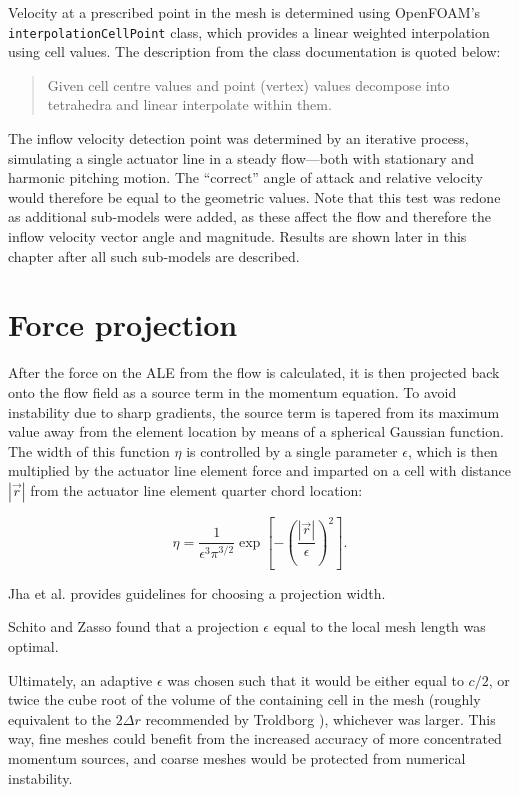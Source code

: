 Velocity at a prescribed point in the mesh is determined using OpenFOAM's
\texttt{interpolationCellPoint} class, which provides a linear weighted
interpolation using cell values. The description from the class documentation is
quoted below:

\begin{quote}
    Given cell centre values and point (vertex) values decompose into
    tetrahedra and linear interpolate within them.
\end{quote}

The inflow velocity detection point was determined by an iterative process,
simulating a single actuator line in a steady flow---both with stationary and
harmonic pitching motion. The ``correct'' angle of attack and relative velocity
would therefore be equal to the geometric values. Note that this test was redone
as additional sub-models were added, as these affect the flow and therefore the
inflow velocity vector angle and magnitude. Results are shown later in this
chapter after all such sub-models are described.


\section{Force projection}

After the force on the ALE from the flow is calculated, it is then projected
back onto the flow field as a source term in the momentum equation. To avoid
instability due to sharp gradients, the source term is tapered from its maximum
value away from the element location by means of a spherical Gaussian function.
The width of this function $\eta$ is controlled by a single parameter
$\epsilon$, which is then multiplied by the actuator line element force and
imparted on a cell with distance $| \vec{r} |$ from the actuator line element
quarter chord location:

\begin{equation}
    \eta = \frac{1}{\epsilon^3 \pi^{3/2}} \exp 
    \left[ - \left( \frac{| \vec{r} |}{\epsilon} \right)^2 \right].
    \label{eq:projection}
\end{equation}

Jha et al. \cite{Jha2014} provides guidelines for choosing a projection width.

Schito and Zasso \cite{Schito2014} found that a projection $\epsilon$ equal to
the local mesh length was optimal.

Ultimately, an adaptive $\epsilon$ was chosen such that it would be either equal
to $c/2$, or twice the cube root of the volume of the containing cell in the
mesh (roughly equivalent to the $2\Delta r$ recommended by Troldborg
\cite{Troldborg2008}), whichever was larger. This way, fine meshes could benefit
from the increased accuracy of more concentrated momentum sources, and coarse
meshes would be protected from numerical instability.

